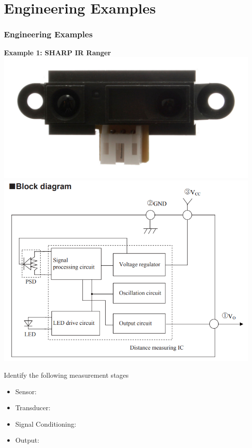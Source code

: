 \documentclass[fleqn]{beamer} %
\newcommand{\sectiontitleV}{Engineering Examples}
\begin{document}
\section{\sectiontitleV}
	\begin{frame}[label=sectionV]
		\frametitle{\sectiontitleV}
			\tiny
		
	        \begin{multicols}{2}
		
		    \textbf{Example 1: SHARP IR Ranger } \vspc
		    \includegraphics[scale=0.5]{proximity_sensor.jpg}
		    \includegraphics[scale=0.15]{sharp_ranger_circuit.png} \vspccc

		    Identify the following measurement stages 
		    \begin{itemize}
		    	\item Sensor: \hspcu
		    	\item Transducer: \hspcu
		    	\item Signal Conditioning: \hspcu
		    	\item Output: \hspcu
		    \end{itemize}



\end{multicols}
\end{frame}
\end{document}
